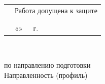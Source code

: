 \thispagestyle{empty}%
\makeatletter
{}
%
\makeatother


\vspace{0pt plus0.1fill}

{\centering%
	\Ministry\\
	\SPbPU\\
	{%
		\institute}
\par}%


\vspace{0pt plus1fill} %


\noindent
\begin{minipage}{\linewidth}
	\vspace{\mfloatsep} %
	\begin{tabularx}{\linewidth}{Xl}
	&Работа допущена к защите     \\
	&\HeadTitle     \\
	&\underline{\hspace*{0.1\textheight}} \Head     \\
	&«\underline{\hspace*{0.05\textheight}}»~\underline{\hspace*{0.1\textheight}}~\thesisYear~г.     \\
	\end{tabularx}
	\vspace{\mfloatsep} %
\end{minipage}


\vspace{0pt plus2fill} %


{\centering%
	
	\MakeUppercase{\bfseries{}\DocType} \\ 
	\MakeUppercase{\normalfont{}\thesisDegree}%


{\centering%
	\MakeUppercase{\bfseries{\thesisTitle}}}%

}\par%

\noindent	по направлению подготовки \thesisSpecialtyCodeAndTitle{}\\%
\noindent	Направленность (профиль)	\thesisOPCodeAndTitle %
\par%





